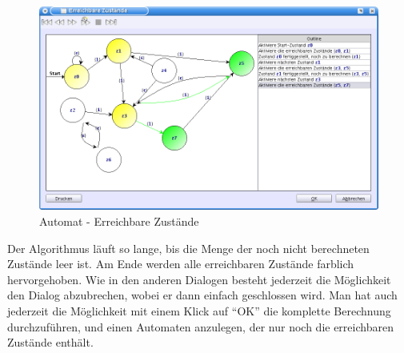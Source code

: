 \begin{figure}[h]
\begin{center}
\includegraphics[width=12cm]{images/reachable_states.png}
\caption{Automat - Erreichbare Zustände}
\end{center}
\end{figure}

Der Algorithmus läuft so lange, bis die Menge der noch nicht berechneten Zustände
leer ist. Am Ende werden alle erreichbaren Zustände farblich hervorgehoben. Wie
in den anderen Dialogen besteht jederzeit die Möglichkeit den Dialog abzubrechen,
wobei er dann einfach geschlossen wird. Man hat auch jederzeit die Möglichkeit
mit einem Klick auf "`OK"' die komplette Berechnung durchzuführen, und einen
Automaten anzulegen, der nur noch die erreichbaren Zustände enthält.
